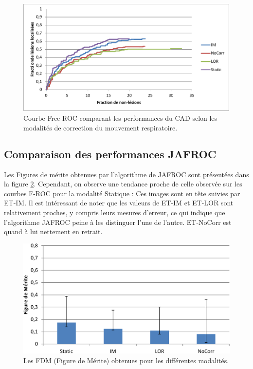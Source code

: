 \begin{figure}[h!]
 \begin{center}
   \includegraphics[width=13cm]{images/FROC_mod}
 \end{center}
 \caption{Courbe Free-ROC comparant les performances du CAD selon les modalités de correction du mouvement respiratoire.}
 \label{fig:froc_mod}
\end{figure}


\subsection{Comparaison des performances JAFROC}

Les Figures de mérite obtenues par l'algorithme de JAFROC sont présentées dans la figure \ref{fig:fom_mod}. Cependant, on observe une tendance proche de celle observée sur les courbes F-ROC pour la modalité Statique : Ces images sont en tête suivies par ET-IM. Il est intéressant de noter que les valeurs de ET-IM et ET-LOR sont relativement proches, y compris leurs mesures d'erreur, ce qui indique que l'algorithme JAFROC peine à les distinguer l'une de l'autre. ET-NoCorr est quand à lui nettement en retrait. 

\begin{figure}[h!]
 \begin{center}
   \includegraphics[width=13cm]{images/FOM_mod}
 \end{center}
 \caption{Les FDM (Figure de Mérite) obtenues pour les différentes modalités.}
 \label{fig:fom_mod}
\end{figure}

